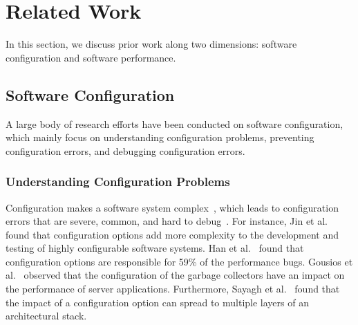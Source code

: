 \section{Related Work}
\label{sec:relatedwork}

In this section, we discuss prior work along two dimensions: software configuration and software performance. %

\subsection{Software Configuration}

A large body of research efforts have been conducted on software configuration, which mainly focus on understanding configuration problems, preventing configuration errors, and debugging configuration errors. %

\subsubsection{Understanding Configuration Problems}
Configuration makes a software system complex~\cite{tse}, which leads to configuration errors that are severe, common, and hard to debug~\cite{RN3251}. For instance, Jin et al.~\cite{RN2897} found that configuration options add more complexity to the development and testing of highly configurable software systems. Han et al.~\cite{RN2864} found that configuration options are responsible for 59\% of the performance bugs. Gousios et al.~\cite{RN3551} observed that the configuration of the garbage collectors have an impact on the performance of server applications. Furthermore, Sayagh et al.~\cite{RN3249, RN2758} found that the impact of a configuration option can spread to multiple layers of an architectural stack.%

